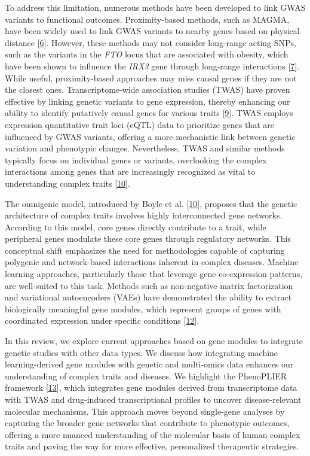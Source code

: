 To address this limitation, numerous methods have been developed to link GWAS variants to functional outcomes.
Proximity-based methods, such as MAGMA, have been widely used to link GWAS variants to nearby genes based on physical distance {[}\protect\hyperlink{ref-19XiXgYmd}{6}{]}.
However, these methods may not consider long-range acting SNPs, such as the variants in the \emph{FTO} locus that are associated with obesity, which have been shown to influence the \emph{IRX3} gene through long-range interactions {[}\protect\hyperlink{ref-167QL5tMV}{7}{]}.
While useful, proximity-based approaches may miss causal genes if they are not the closest ones.
Transcriptome-wide association studies (TWAS) have proven effective by linking genetic variants to gene expression, thereby enhancing our ability to identify putatively causal genes for various traits {[}\protect\hyperlink{ref-l6ogswV3}{9}{]}.
TWAS employs expression quantitative trait loci (eQTL) data to prioritize genes that are influenced by GWAS variants, offering a more mechanistic link between genetic variation and phenotypic changes.
Nevertheless, TWAS and similar methods typically focus on individual genes or variants, overlooking the complex interactions among genes that are increasingly recognized as vital to understanding complex traits {[}\protect\hyperlink{ref-vpIDZCSa}{10}{]}.

The omnigenic model, introduced by Boyle et al. {[}\protect\hyperlink{ref-vpIDZCSa}{10}{]}, proposes that the genetic architecture of complex traits involves highly interconnected gene networks.
According to this model, core genes directly contribute to a trait, while peripheral genes modulate these core genes through regulatory networks.
This conceptual shift emphasizes the need for methodologies capable of capturing polygenic and network-based interactions inherent in complex diseases.
Machine learning approaches, particularly those that leverage gene co-expression patterns, are well-suited to this task.
Methods such as non-negative matrix factorization and variational autoencoders (VAEs) have demonstrated the ability to extract biologically meaningful gene modules, which represent groups of genes with coordinated expression under specific conditions {[}\protect\hyperlink{ref-170T6ip47}{12}{]}.

In this review, we explore current approaches based on gene modules to integrate genetic studies with other data types.
We discuss how integrating machine learning-derived gene modules with genetic and multi-omics data enhances our understanding of complex traits and diseases.
We highlight the PhenoPLIER framework {[}\protect\hyperlink{ref-NM3rHx1i}{13}{]}, which integrates gene modules derived from transcriptome data with TWAS and drug-induced transcriptional profiles to uncover disease-relevant molecular mechanisms.
This approach moves beyond single-gene analyses by capturing the broader gene networks that contribute to phenotypic outcomes, offering a more nuanced understanding of the molecular basis of human complex traits and paving the way for more effective, personalized therapeutic strategies.

